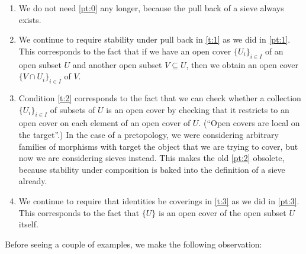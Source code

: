 \documentclass[12pt,reqno,a4paper]{amsart}
\theoremstyle{plain}
\theoremstyle{definition}
\theoremstyle{remark}
\begin{document}
\begin{enumerate}\addtocounter{enumi}{-1}
  \item We do not need \ref{pt:0} any longer, because the pull back of a sieve always exists.
  \item We continue to require stability under pull back in \ref{t:1} as we did in \ref{pt:1}.
    This corresponds to the fact that if we have an open cover $\{ U_{i} \}_{i \in I}$ of an open subset $U$ and another open subset $V \subseteq U$, then we obtain an open cover $\{ V \cap U_{i} \}_{i \in I}$ of $V$.
  \item Condition \ref{t:2} corresponds to the fact that we can check whether a collection $\{ U_{i} \}_{i \in I}$ of subsets of $U$ is an open cover by checking that it restricts to an open cover on each element of an open cover of $U$.
    (``Open covers are local on the target''.)
    In the case of a pretopology, we were considering arbitrary families of morphisms with target the object that we are trying to cover, but now we are considering sieves instead.
    This makes the old \ref{pt:2} obsolete, because stability under composition is baked into the definition of a sieve already.
  \item We continue to require that identities be coverings in \ref{t:3} as we did in \ref{pt:3}.
    This corresponds to the fact that $\{ U \}$ is an open cover of the open subset $U$ itself.
\end{enumerate}

Before seeing a couple of examples, we make the following observation:
\end{document}

